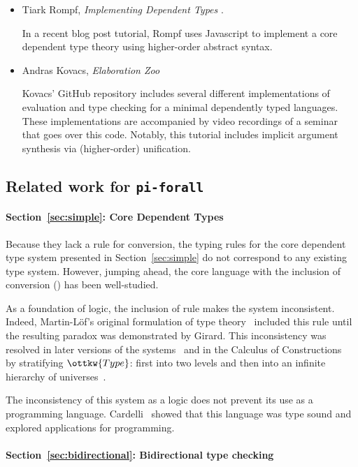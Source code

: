 \documentclass{article}
\newcommand\pif{\texttt{pi-forall}\xspace}
\theoremstyle{definition}
\begin{document}
\begin{itemize}
\item Tiark Rompf, \emph{Implementing Dependent Types} \cite{rompf:tutorial}.

  In a recent blog post tutorial, Rompf uses Javascript to implement a core
  dependent type theory using higher-order abstract syntax.

\item Andras Kovacs, \emph{Elaboration Zoo} \cite{kovacs:tutorial}

  Kovacs' GitHub repository includes several different implementations of
  evaluation and type checking for a minimal dependently typed
  languages. These implementations are accompanied by video recordings of a
  seminar that goes over this code. Notably, this tutorial includes implicit
  argument synthesis via (higher-order) unification.

\end{itemize}

\subsection{Related work for \pif}

\paragraph{Section~\ref{sec:simple}:  Core Dependent Types}

Because they lack a rule for conversion, the typing rules for the core
dependent type system presented in Section~\ref{sec:simple} do not correspond
to any existing type system. However, jumping ahead, the core language with
the inclusion of conversion () has been well-studied.

As a foundation of logic, the inclusion of rule  makes the system
inconsistent. Indeed, Martin-L\"of's original formulation of type
theory~\cite{martin-lof71} included this rule until the resulting paradox
was demonstrated by Girard. This inconsistency was resolved in later versions
of the systems~\cite{martin-lof73} and in the Calculus of
Constructions~\cite{Coc} by stratifying $\ottkw{Type}$: first into two levels and
then into an infinite hierarchy of universes~\cite{luo-ecc}.

The inconsistency of this system as a logic does not prevent its use as a
programming language. Cardelli~\cite{cardelli:1986} showed that this
language was type sound and explored applications for programming.

\paragraph{Section~\ref{sec:bidirectional}:  Bidirectional type checking}
\end{document}
